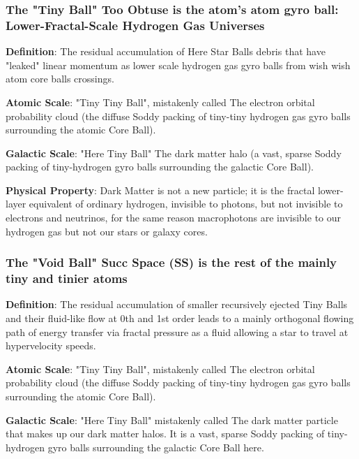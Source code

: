 \documentclass[11pt,a4paper]{article}
\begin{document}

    \subsubsection
    { The "Tiny Ball" Too Obtuse is the atom's atom gyro ball: Lower-Fractal-Scale Hydrogen Gas Universes
    }

    \noindent\textbf{Definition}: The residual accumulation of Here Star Balls debris that have "leaked" linear momentum as lower scale hydrogen gas gyro balls from wish wish atom core balls crossings.

    \noindent\textbf{Atomic Scale}: "Tiny Tiny Ball", mistakenly called The electron orbital probability cloud (the diffuse Soddy packing of tiny-tiny hydrogen gas gyro balls surrounding the atomic Core Ball).

    \noindent\textbf{Galactic Scale}: "Here Tiny Ball" The dark matter halo (a vast, sparse Soddy packing of tiny-hydrogen gyro balls surrounding the galactic Core Ball).

    \noindent\textbf{Physical Property}: Dark Matter is not a new particle; it is the fractal lower-layer equivalent of ordinary hydrogen, invisible to photons, but not invisible to electrons and neutrinos, for the same reason macrophotons are invisible to our hydrogen gas but not our stars or galaxy cores.


    \subsubsection
    { The "Void Ball" Succ Space (SS) is the rest of the mainly tiny and tinier atoms
    }

    \noindent\textbf{Definition}: The residual accumulation of smaller  recursively ejected Tiny Balls and their fluid-like flow at 0th and 1st order leads to a mainly orthogonal flowing path of energy transfer via fractal pressure as a fluid allowing a star to travel at hypervelocity speeds. 

    \noindent\textbf{Atomic Scale}: "Tiny Tiny Ball", mistakenly called The electron orbital probability cloud (the diffuse Soddy packing of tiny-tiny hydrogen gas gyro balls surrounding the atomic Core Ball).

    \noindent\textbf{Galactic Scale}: "Here Tiny Ball" mistakenly called The dark matter particle that makes up our dark matter halos. It is a vast, sparse Soddy packing of tiny-hydrogen gyro balls surrounding the galactic Core Ball here.
\end{document}
